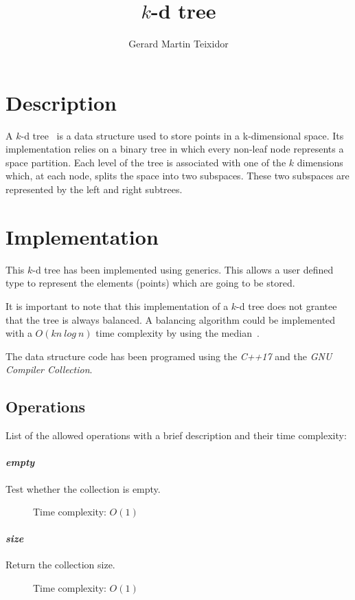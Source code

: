 \documentclass{article}
\title{$k$-d tree}
\author{Gerard Martin Teixidor}
\begin{document}
\maketitle

\section*{Description}
A $k$-d tree~\cite{kd-tree} is a data structure used to store points in a k-dimensional space. Its implementation relies on a binary tree in which every non-leaf node represents a space partition. Each level of the tree is associated with one of the $k$ dimensions which, at each node, splits the space into two subspaces. These two subspaces are represented by the left and right subtrees.

\section*{Implementation}
This $k$-d tree has been implemented using generics. This allows a user defined type to represent the elements (points) which are going to be stored.

It is important to note that this implementation of a $k$-d tree does not grantee that the tree is always balanced. A balancing algorithm could be implemented with a $O(kn~log~n)$ time complexity by using the median~\cite{balanced}.

The data structure code has been programed using the \textit{C++17} and the \textit{GNU Compiler Collection}.

\subsection*{Operations}
List of the allowed operations with a brief description and their time complexity:

\paragraph*{\textit{empty}} Test whether the collection is empty.
\begin{description}
\item[] Time complexity: $O(1)$
\end{description}

\paragraph*{\textit{size}} Return the collection size.
\begin{description}
\item[] Time complexity: $O(1)$
\end{description}
\end{document}
